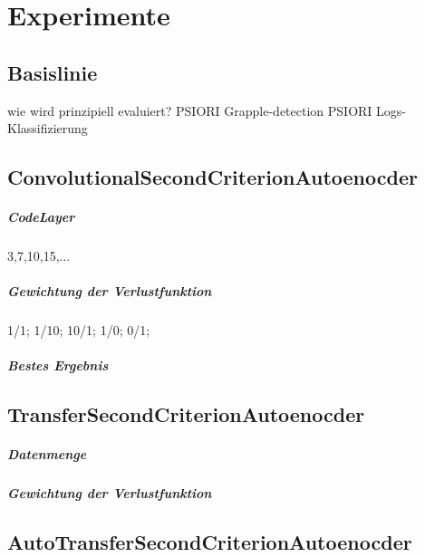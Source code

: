 \listoftodos


\chapter{Experimente}
\label{chap:Experimente}

	\section{Basislinie}
	\label{sec:Basislinie}
	wie wird prinzipiell evaluiert?
	PSIORI Grapple-detection
	PSIORI Logs-Klassifizierung
		
	\section{ConvolutionalSecondCriterionAutoenocder}
	\label{sec:ConvolutionalSecondCriterionAutoenocder}
			\paragraph{CodeLayer}
				3,7,10,15,...
			\paragraph{Gewichtung der Verlustfunktion}
			1/1; 1/10; 10/1; 1/0; 0/1;
			\paragraph{Bestes Ergebnis}
	\section{TransferSecondCriterionAutoenocder}
	\label{sec:TransferSecondCriterionAutoenocder}
			\paragraph{Datenmenge}
			\paragraph{Gewichtung der Verlustfunktion}
	\section{AutoTransferSecondCriterionAutoenocder}
	\label{sec:AutoTransferSecondCriterionAutoenocder}


		